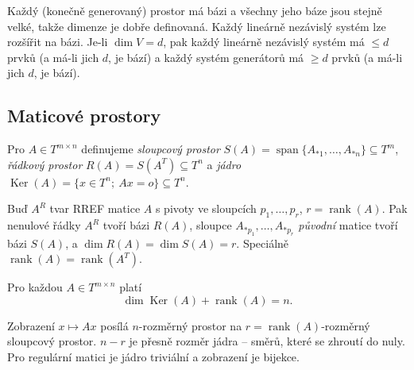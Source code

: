 \documentclass[11pt,a4paper]{article}
\newcommand{\rank}{\operatorname{rank}}
\newcommand{\Ker}{\operatorname{Ker}}
\newcommand{\spn}{\operatorname{span}}
\begin{document}
\begin{veta}
Každý (konečně generovaný) prostor má bázi a všechny jeho báze jsou stejně velké, takže dimenze je dobře definovaná. Každý lineárně nezávislý systém lze rozšířit na bázi. Je-li $\dim V=d$, pak každý lineárně nezávislý systém má $\le d$ prvků (a má-li jich $d$, je bází) a každý systém generátorů má $\ge d$ prvků (a má-li jich $d$, je bází).
\end{veta}


\subsection{Maticové prostory}

\begin{definice}
Pro $A\in T^{m\times n}$ definujeme \emph{sloupcový prostor} $S(A)=\spn\{A_{*1},\dots,A_{*n}\}\subseteq T^m$, \emph{řádkový prostor} $R(A)=S(A^T)\subseteq T^n$ a \emph{jádro} $\Ker(A)=\{x\in T^n;\ Ax=o\}\subseteq T^n$.
\end{definice}

\begin{veta}
Buď $A^R$ tvar RREF matice $A$ s pivoty ve sloupcích $p_1,\dots,p_r$, $r=\rank(A)$. Pak nenulové řádky $A^R$ tvoří bázi $R(A)$, sloupce $A_{*p_1},\dots,A_{*p_r}$ \emph{původní} matice tvoří bázi $S(A)$, a $\dim R(A)=\dim S(A)=r$. Speciálně $\rank(A)=\rank(A^T)$.
\end{veta}

\begin{veta}
Pro každou $A\in T^{m\times n}$ platí
\[
  \dim\Ker(A)+\rank(A)=n.
\]
\end{veta}

\begin{intuice}
Zobrazení $x\mapsto Ax$ posílá $n$-rozměrný prostor na $r=\rank(A)$-rozměrný sloupcový prostor.  $n-r$ je přesně rozměr jádra -- směrů, které se zhroutí do nuly. Pro regulární matici je jádro triviální a zobrazení je bijekce.
\end{intuice}

\end{document}
